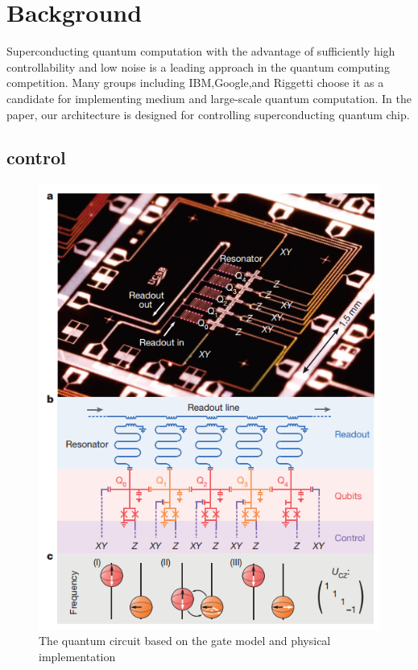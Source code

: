 \section{Background}
Superconducting quantum computation with the advantage of sufficiently high controllability and low noise is a leading approach in the quantum computing competition.
Many groups including IBM,Google,and Riggetti choose it as a candidate for implementing medium and large-scale quantum computation.
In the paper, our architecture is designed for controlling superconducting quantum chip.
\subsection{control}

\begin{figure}[ht]
  \centering
  \includegraphics[width=\linewidth]{figure/background}
  \caption{ The quantum circuit based on the gate model and physical implementation}
  \label{imgb}
\end{figure}


